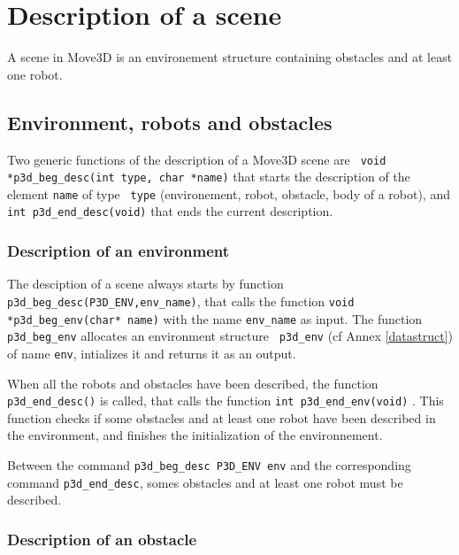 \chapter{Description of a scene}
\label{model}

A scene in Move3D is an environement structure containing obstacles
and at least one robot. 

\section{Environment, robots and obstacles}

Two generic functions of the description of a Move3D scene are  {\tt
void *p3d\_beg\_desc(int type, char *name)} 
that starts the description of the element {\tt name} of type {\tt
type} (environement, robot, obstacle, body of a robot), and {\tt int
p3d\_end\_desc(void)}  that ends the current
description.

\subsection{Description of an environment}


The desciption of a scene always starts by function {\tt
p3d\_beg\_desc(P3D\_ENV,env\_name)}, that calls the function {\tt void
*p3d\_beg\_env(char* name)}  with the name {\tt env\_name} as input. The
function {\tt p3d\_beg\_env} allocates an environment structure {\tt
p3d\_env} (cf Annex \ref{datastruct}) of name {\tt env},
intializes it and returns it as an output.

When all the robots and obstacles have been described, the function
{\tt p3d\_end\_desc()} is called, that calls the function {\tt int
p3d\_end\_env(void)} . This function checks if some obstacles and at
least one robot have been described in the environment, and finishes
the initialization of the environnement.

Between the command {\tt p3d\_beg\_desc P3D\_ENV
env} and the corresponding command {\tt p3d\_end\_desc}, somes
obstacles and at least one robot must be described.

\subsection{Description of an obstacle}


